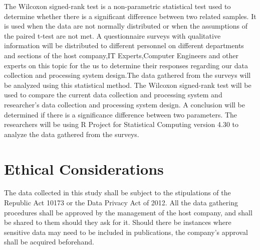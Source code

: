 \documentclass[12pt]{report}
\begin{document}
The Wilcoxon signed-rank test is a non-parametric statistical test used to determine whether there is a significant difference between two related samples. 
It is used when the data are not normally distributed or when the assumptions of the paired t-test are not met.
A questionnaire surveys with qualitative information will be distributed to different personnel on different departments and sections of the host company,IT Experts,Computer Engineers and other experts on this topic for the us to determine their responses regarding our data collection and processing system design.The data gathered from the surveys will be analyzed using this statistical method.
The Wilcoxon signed-rank test will be used to compare the current data collection and processing system and researcher’s data collection and processing system design. 
A conclusion will be determined if there is a significance difference between two parameters.
The researchers will be using R Project for Statistical Computing version 4.30 to analyze the data gathered from the surveys.

\section{Ethical Considerations}

The data collected in this study shall be subject to the stipulations of the Republic Act 10173 or the Data Privacy Act of 2012.
All the data gathering procedures shall be approved by the management of the host company, and shall be shared to them should they ask for it.
Should there be instances where sensitive data may need to be included in publications, the company's approval shall be acquired beforehand.


\printbibliography[
    title = {REFERENCES},
    heading = bibintoc
]

\setlength{\parindent}{0mm}
\end{document}
